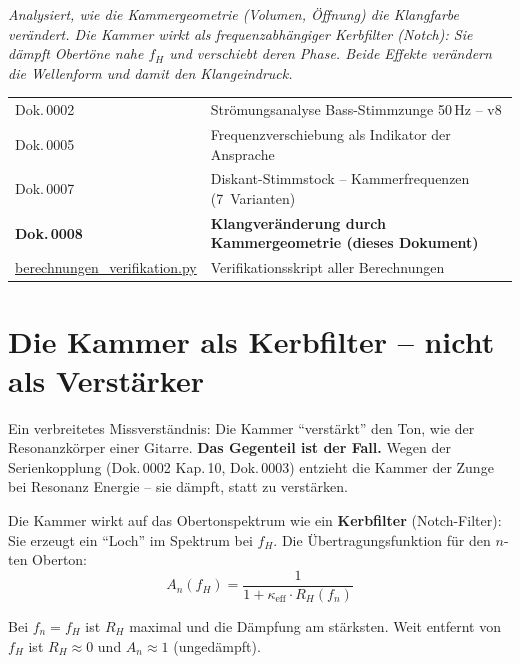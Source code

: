 \documentclass[11pt,a4paper]{article}
\begin{document}
\hbmaketitle

{\small\itshape Analysiert, wie die Kammergeometrie (Volumen, Öffnung) die Klangfarbe verändert. Die Kammer wirkt als frequenzabhängiger Kerbfilter (Notch): Sie dämpft Obertöne nahe $f_H$ und verschiebt deren Phase. Beide Effekte verändern die Wellenform und damit den Klangeindruck.}

\vspace{2mm}
\begin{center}\small
\begin{tabularx}{\textwidth}{l X}
\hbtoprule
Dok.\,0002 & Strömungsanalyse Bass-Stimmzunge 50\,Hz -- v8 \\
Dok.\,0005 & Frequenzverschiebung als Indikator der Ansprache \\
Dok.\,0007 & Diskant-Stimmstock -- Kammerfrequenzen (7~Varianten) \\
\textbf{Dok.\,0008} & \textbf{Klangveränderung durch Kammergeometrie (dieses Dokument)} \\
\midrule
\href{berechnungen_verifikation.py}{berechnungen\_verifikation.py} & Verifikationsskript aller Berechnungen \\
\bottomrule
\end{tabularx}
\end{center}
\vspace{4mm}


\section{Die Kammer als Kerbfilter -- nicht als Verstärker}

Ein verbreitetes Missverständnis: Die Kammer ``verstärkt'' den Ton, wie der Resonanzkörper einer Gitarre. \textbf{Das Gegenteil ist der Fall.} Wegen der Serienkopplung (Dok.\,0002 Kap.\,10, Dok.\,0003) entzieht die Kammer der Zunge bei Resonanz Energie -- sie dämpft, statt zu verstärken.

Die Kammer wirkt auf das Obertonspektrum wie ein \textbf{Kerbfilter} (Notch-Filter): Sie erzeugt ein ``Loch'' im Spektrum bei $f_H$. Die Übertragungsfunktion für den $n$-ten Oberton:
\begin{equation}
A_n(f_H) = \frac{1}{1 + \kappa_\text{eff} \cdot R_H(f_n)}
\end{equation}

Bei $f_n = f_H$ ist $R_H$ maximal und die Dämpfung am stärksten. Weit entfernt von $f_H$ ist $R_H \approx 0$ und $A_n \approx 1$ (ungedämpft).
\end{document}

